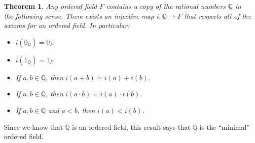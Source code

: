 \documentclass[12pt]{article}
\newcommand{\bbQ}{\mathbb{Q}}
\providecommand{\arr}{\longrightarrow}
\renewcommand{\_}[1]{\underline{ #1 }}
\newtheorem{theorem}{Theorem}[section]
\theoremstyle{definition}
\numberwithin{equation}{subsection}
\begin{document}
\begin{theorem}  Any ordered field $F$ contains  a copy of the rational numbers $\bbQ$ in 
the following sense.  There exists an injective map $i:\bbQ\arr F$ that respects all of the axioms
for an ordered field.  In particular:
\begin{itemize}
\item $i(0_\bbQ)=0_F$

\item $i(1_\bbQ)=1_F$

\item If $a, b\in \bbQ$, then $i(a+b)=i(a)+i(b)$.

\item If $a, b\in \bbQ$, then $i(a\cdot b)=i(a)\cdot i(b)$.

\item If $a, b\in \bbQ$ and $a<b$, then $i(a)< i(b)$.
\end{itemize}
\end{theorem}

\noindent Since we know that $\bbQ$ is an ordered field, this result says that $\bbQ$ is the ``minimal'' ordered field.
\end{document}
